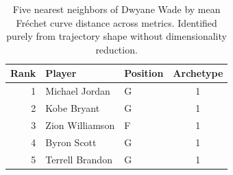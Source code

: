 \begin{table}[htbp]
  \centering\small
  \begin{tabular}{rllc}
    \toprule
    Rank & Player & Position & Archetype \\
    \midrule
    1 & Michael Jordan & G & 1 \\
    2 & Kobe Bryant & G & 1 \\
    3 & Zion Williamson & F & 1 \\
    4 & Byron Scott & G & 1 \\
    5 & Terrell Brandon & G & 1 \\
    \bottomrule
  \end{tabular}
  \caption{Five nearest neighbors of Dwyane Wade by mean Fr\'{e}chet curve distance across metrics. Identified purely from trajectory shape without dimensionality reduction.}
  \label{tab:Dwyane_Wade_frechet_curve_neighbors}
\end{table}


